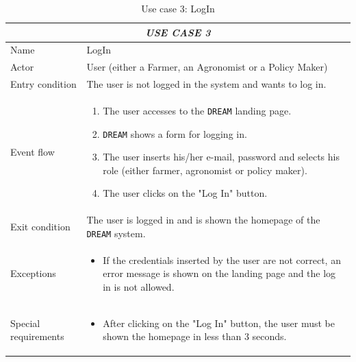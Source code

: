 \documentclass{article}
\begin{document}
\centering
\begin{longtable}{|p{3.5cm}|m{8cm}|}
\caption{Use case 3: LogIn}
 \label{uc3}
 \hline
 \multicolumn{2}{|c|}{\cellcolor{white}\emph{USE CASE 3}} \\
 \endfirsthead
 \endhead
 \endfoot
 \endlastfoot
 \hline
 Name & LogIn\\
 \hline
 Actor & User (either a Farmer, an Agronomist or a Policy Maker)\\
 \hline
 Entry condition & The user is not logged in the system and wants to log in.\\
 \hline
 Event flow & \begin{enumerate}
    \item The user accesses to the \verb|DREAM| landing page.
    \item \verb|DREAM| shows a form for logging in.
    \item The user inserts his/her e-mail, password and selects his role (either farmer, agronomist or policy maker).
    \item The user clicks on the "Log In" button. 
 \end{enumerate}\\
 \hline
 Exit condition & The user is logged in and is shown the homepage of the \verb|DREAM| system.\\
 \hline
 Exceptions & \begin{itemize}
     \item If the credentials inserted by the user are not correct, an error message is shown on the landing page and the log in is not allowed.
 \end{itemize}\\
 \hline
 Special requirements & \begin{itemize}
     \item After clicking on the "Log In" button, the user must be shown the homepage in less than 3 seconds.
 \end{itemize}\\
 \hline
\end{longtable}
\end{document}
